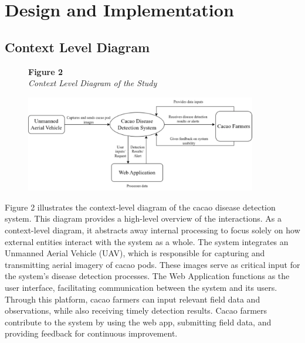 	\section{Design and Implementation} 
	
	\subsection{Context Level Diagram}
	
	\begin{figure}[H]
		\raggedright
		\textbf{Figure 2} \\ %
		\textit{Context Level Diagram of the Study} %
		
		\vspace{0.5em}
		\centering
		\includegraphics[width=0.9\textwidth]{figures/Context-Level.pdf} %
		
		\vspace{0.5em}
		\raggedright
		
		\label{fig:context-level}
	\end{figure}
	
	Figure 2 illustrates the context-level diagram of the cacao disease detection system. This diagram provides a high-level overview of the interactions. As a context-level diagram, it abstracts away internal processing to focus solely on how external entities interact with the system as a whole. The system integrates an Unmanned Aerial Vehicle (UAV), which is responsible for capturing and transmitting aerial imagery of cacao pods. These images serve as critical input for the system’s disease detection processes. The Web Application functions as the user interface, facilitating communication between the system and its users. Through this platform, cacao farmers can input relevant field data and observations, while also receiving timely detection results. Cacao farmers contribute to the system by using the web app, submitting field data, and providing feedback for continuous improvement.
	
